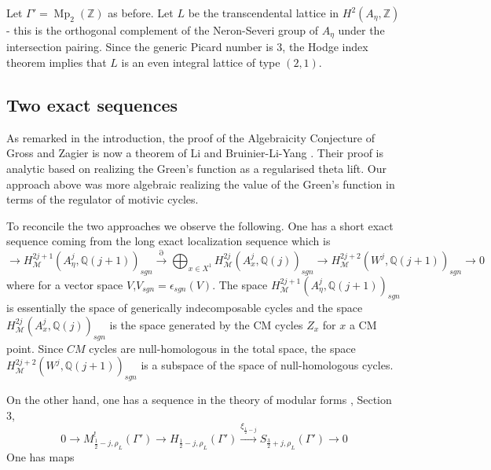 \documentclass[11pt,a4paper]{article}
\newcommand {\ZZ}{{\mathds Z}}
\newcommand {\Q}{{\mathds Q}}
\newcommand {\M}{{\mathcal M}}
\DeclareMathOperator{\Mp}{Mp}
\begin{document}
Let $\Gamma'=\Mp_2(\ZZ)$ as before. Let $L$ be the  transcendental lattice in $H^2(A_{\eta},\ZZ)$ - this is the orthogonal complement of the Neron-Severi group of $A_\eta$ under the intersection pairing. Since the generic Picard number is $3$, the Hodge index theorem implies that $L$ is an even integral lattice of type $(2,1)$. 

\subsection{Two exact sequences}

As remarked in the introduction, the proof of the Algebraicity Conjecture of Gross and Zagier is now a theorem of Li \cite{li} and Bruinier-Li-Yang \cite{BLY}. Their proof is analytic based on realizing the Green's function as a regularised theta lift. Our approach above was more algebraic realizing the value of the Green's function in terms of the regulator of motivic cycles. 

To reconcile the two approaches we observe the following. One has a short exact sequence coming from the long exact localization sequence which is 
%
$$ \longrightarrow H^{2j+1}_{\M}(A^{j}_{\eta},\Q(j+1))_{sgn} \stackrel{\partial}{\longrightarrow} \bigoplus_{x \in X^1} H^{2j}_{\M}(A^{j}_x,\Q(j))_{sgn} \longrightarrow H^{2j+2}_{\M}(W^{j},\Q(j+1))_{sgn} \longrightarrow 0 $$
%
where for a vector space $V$,$V_{sgn}=\epsilon_{sgn}(V)$. The space  $H^{2j+1}_{\M}(A^{j}_{\eta},\Q(j+1))_{sgn}$ is essentially the space of generically indecomposable cycles and the space $H^{2j}_{\M}(A^{j}_x,\Q(j))_{sgn}$ is the space generated  by the CM cycles $Z_x$ for $x$ a CM point. Since $CM$ cycles are null-homologous in the total space, the space $H^{2j+2}_{\M}(W^{j},\Q(j+1))_{sgn}$ is a subspace of the space of null-homologous cycles. 

On the other hand, one has a sequence in the theory of modular forms \cite{brfu}, Section 3, 
%
$$ 0 \longrightarrow M^!_{\frac{1}{2}-j,\rho_L}(\Gamma') \longrightarrow H_{\frac{1}{2}-j,\rho_L}(\Gamma') \stackrel{\xi_{\frac{1}{2}-j}}{\longrightarrow} S_{\frac{3}{2}+j,\rho_L}(\Gamma') \longrightarrow 0$$
%
One has maps
\end{document}
